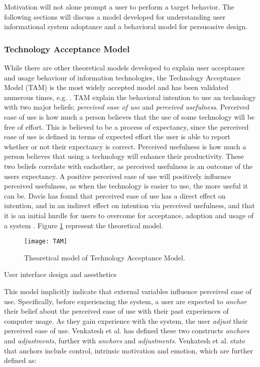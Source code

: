 Motivation will not alone prompt a user to perform a target behavior. The following sections will discuss a model developed for understanding user informational system adoptance and a behavioral model for persusasive design.

\subsubsection{Technology Acceptance Model}
While there are other theoretical models developed to explain user acceptance and usage behaviour of information technologies, the Technology Acceptance Model (TAM) \cite{Davis1989} \cite{Davis1989a} is the most widely accepted model and has been validated numerous times, e.g. \cite{Hu1999} \cite{Chau1996} \cite{Mathieson1991}. TAM explain the behavioral intention to use an technology with two major beliefs; \textit{perceived ease of use} and \textit{perceived usefulness}. Perceived ease of use is how much a person believes that the use of some technology will be free of effort. This is believed to be a process of expectancy, since the perceived ease of use is defined in terms of expected effort the user is able to report whether or not their expectancy is correct. Perceived usefulness is how much a person believes that using a technology will enhance their productivity. These two beliefs correlate with eachother, as perceived usefulness is an outcome of the users expectancy. A positive perceived ease of use will positively influence perceived usefulness, as when the technology is easier to use, the more useful it can be. Davis \cite{Davis1989} has found that perceived ease of use has a direct effect on intention, and in an indirect effect on intention via perceived usefulness, and that it is an initial hurdle for users to overcome for acceptance, adoption and usage of a system \cite{Davis1989a}. Figure \ref{fig:TAM} represent the theoretical model.

\begin{figure}[h]
  \label{fig:TAM}
  \centering
    \texttt{[image: TAM]}
  \caption{Theoretical model of Technology Acceptance Model.}
\end{figure}

User interface design and asesthetics

This model implicitly indicate that external variables influence perceived ease of use. Specifically, before experiencing the system, a user are expected to \textit{anchor} their belief about the perceived ease of use with their past experiences of computer usage. As they gain experience with the system, the user \textit{adjust} their perceived ease of use. Venkatesh et al. \cite{Venkatesh2000} has defined these two constructs \textit{anchors} and \textit{adjustments}, further with  \textit{anchors} and \textit{adjustments}. Venkatesh et al. state that anchors include control, intrinsic motivation and emotion, which are further defined as:

